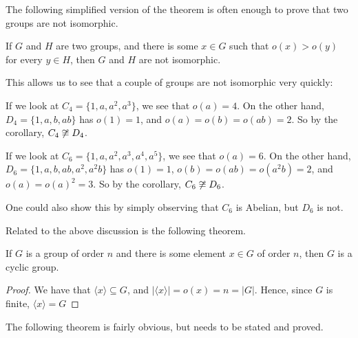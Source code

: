 The following simplified version of the theorem is often enough to 
prove that two groups are not isomorphic.

\begin{corollary}
    If $G$ and $H$ are two groups, and there is some $x \in G$ such 
    that $o(x) > o(y)$ for every $y \in H$, then $G$ and $H$ are not 
    isomorphic.
\end{corollary}

This allows us to see that a couple of groups are not isomorphic very 
quickly:

\begin{example}
    If we look at $C_{4} = \{1, a, a^{2}, a^{3}\}$, we see that 
    $o(a) = 4$.  On the other hand, $D_{4} = \{1, a, b, ab\}$ has 
    $o(1) = 1$, and $o(a) = o(b) = o(ab) = 2$.  So by the corollary, 
    $C_{4} \not\cong D_{4}$.
\end{example}

\begin{example}
    If we look at $C_{6} = \{1, a, a^{2}, a^{3}, a^{4}, a^{5}\}$, we see that 
    $o(a) = 6$.  On the other hand, $D_{6} = \{1, a, b, ab, a^{2}, 
    a^{2}b\}$ has $o(1) = 1$, $o(b) = o(ab) = o(a^{2}b) = 2$, and 
    $o(a) = o(a)^{2} = 3$.
    So by the corollary, $C_{6} \not\cong D_{6}$.
    
    One could also show this by simply observing that $C_{6}$ is 
    Abelian, but $D_{6}$ is not.
\end{example}

Related to the above discussion is the following theorem.

\begin{theorem}\label{thm:cyclicgroups}
    If $G$ is a group of order $n$ and there is some element $x \in G$ 
    of order $n$, then $G$ is a cyclic group.
\end{theorem}
\begin{proof}
    We have that $\langle x \rangle \subseteq G$, and $|\langle x 
    \rangle| = o(x) = n = |G|$.  Hence, since $G$ is finite, $\langle x 
    \rangle = G$
\end{proof}

The following theorem is fairly obvious, but needs to be stated and 
proved.

